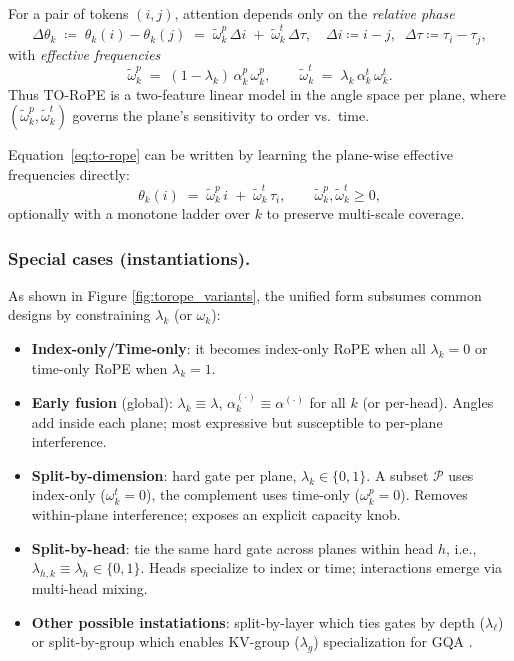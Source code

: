 \documentclass[sigconf]{acmart}
\begin{document}
For a pair of tokens $(i,j)$, attention depends only on the \emph{relative phase}
\[
\Delta\theta_k \;\coloneqq\; \theta_k(i)-\theta_k(j)
\;=\; \tilde{\omega}^{p}_{k}\,\Delta i \;+\; \tilde{\omega}^{t}_{k}\,\Delta\tau,
\quad
\Delta i \coloneqq i-j,\;\; \Delta\tau \coloneqq \tau_i-\tau_j,
\]
with \emph{effective frequencies}
\[
\tilde{\omega}^{p}_{k} \;=\; (1-\lambda_k)\,\alpha^{p}_{k}\,\omega^{p}_{k},
\qquad
\tilde{\omega}^{t}_{k} \;=\; \lambda_k\,\alpha^{t}_{k}\,\omega^{t}_{k}.
\]
Thus TO-RoPE is a two-feature linear model in the angle space per plane, where $(\tilde{\omega}^{p}_{k},\tilde{\omega}^{t}_{k})$ governs the plane’s sensitivity to order vs.\ time.

Equation~\eqref{eq:to-rope} can be written by learning the plane-wise effective frequencies directly:
\[
\theta_k(i) \;=\; \tilde{\omega}^{p}_k\, i \;+\; \tilde{\omega}^{t}_k\, \tau_i,
\qquad
\tilde{\omega}^{p}_k,\tilde{\omega}^{t}_k \ge 0,
\]
optionally with a monotone ladder over $k$ to preserve multi-scale coverage.


\subsubsection{Special cases (instantiations).}
As shown in Figure \ref{fig:torope_variants}, the unified form subsumes common designs by constraining $\lambda_k$ (or $\omega_k$):
\begin{itemize}
\item \textbf{Index-only/Time-only}: it becomes index-only RoPE when all $\lambda_k=0$ or time-only RoPE when $\lambda_k=1$.
\item \textbf{Early fusion} (global): $\lambda_k\equiv\lambda$, $\alpha^{(\cdot)}_{k}\equiv\alpha^{(\cdot)}$ for all $k$ (or per-head). Angles add inside each plane; most expressive but susceptible to per-plane interference.
\item \textbf{Split-by-dimension}: hard gate per plane, $\lambda_k\in\{0,1\}$. A subset $\mathcal{P}$ uses index-only ($\omega^{t}_k{=}0$), the complement uses time-only ($\omega^{p}_k{=}0$). Removes within-plane interference; exposes an explicit capacity knob.
\item \textbf{Split-by-head}: tie the same hard gate across planes within head $h$, i.e., $\lambda_{h,k}\equiv\lambda_h\in\{0,1\}$. Heads specialize to index or time; interactions emerge via multi-head mixing.
\item \textbf{Other possible instatiations}: split-by-layer which ties gates by depth ($\lambda_\ell$) or split-by-group which enables KV-group ($\lambda_g$) specialization for GQA \cite{Ainslie2023GQATG}.
\end{itemize}
\end{document}
